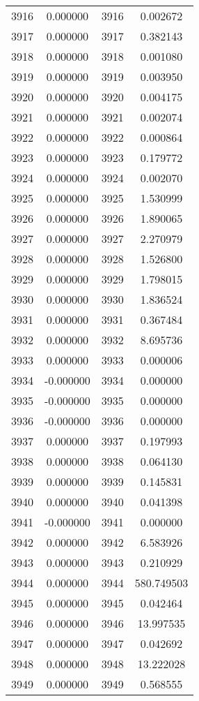\documentclass[12pt]{article}
\begin{document}
\begin{longtable}{@{}cccc@{}}
3916 & 0.000000 & 3916 & 0.002672 \\
3917 & 0.000000 & 3917 & 0.382143 \\
3918 & 0.000000 & 3918 & 0.001080 \\
3919 & 0.000000 & 3919 & 0.003950 \\
3920 & 0.000000 & 3920 & 0.004175 \\
3921 & 0.000000 & 3921 & 0.002074 \\
3922 & 0.000000 & 3922 & 0.000864 \\
3923 & 0.000000 & 3923 & 0.179772 \\
3924 & 0.000000 & 3924 & 0.002070 \\
3925 & 0.000000 & 3925 & 1.530999 \\
3926 & 0.000000 & 3926 & 1.890065 \\
3927 & 0.000000 & 3927 & 2.270979 \\
3928 & 0.000000 & 3928 & 1.526800 \\
3929 & 0.000000 & 3929 & 1.798015 \\
3930 & 0.000000 & 3930 & 1.836524 \\
3931 & 0.000000 & 3931 & 0.367484 \\
3932 & 0.000000 & 3932 & 8.695736 \\
3933 & 0.000000 & 3933 & 0.000006 \\
3934 & -0.000000 & 3934 & 0.000000 \\
3935 & -0.000000 & 3935 & 0.000000 \\
3936 & -0.000000 & 3936 & 0.000000 \\
3937 & 0.000000 & 3937 & 0.197993 \\
3938 & 0.000000 & 3938 & 0.064130 \\
3939 & 0.000000 & 3939 & 0.145831 \\
3940 & 0.000000 & 3940 & 0.041398 \\
3941 & -0.000000 & 3941 & 0.000000 \\
3942 & 0.000000 & 3942 & 6.583926 \\
3943 & 0.000000 & 3943 & 0.210929 \\
3944 & 0.000000 & 3944 & 580.749503 \\
3945 & 0.000000 & 3945 & 0.042464 \\
3946 & 0.000000 & 3946 & 13.997535 \\
3947 & 0.000000 & 3947 & 0.042692 \\
3948 & 0.000000 & 3948 & 13.222028 \\
3949 & 0.000000 & 3949 & 0.568555 \\

\end{longtable}
\end{document}
